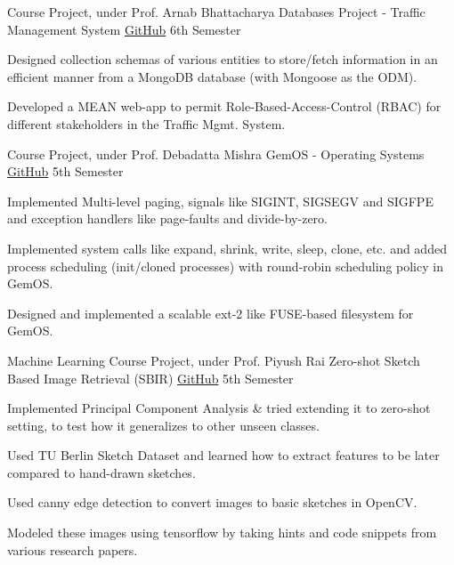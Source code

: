 \begin{cventries}
  \cventry
  {Course Project, under Prof. Arnab Bhattacharya}
  {Databases Project - Traffic Management System}
  {\href{https://github.com/mayanksha/cs315-traffic-mgmt/blob/master/report.pdf}{\faGithubSquare\acvHeaderIconSep GitHub}}
  {6th Semester}
  {
    \begin{cvitems}
    \item Designed collection schemas of various entities to store/fetch information in an efficient manner from a MongoDB database (with Mongoose as the ODM).
    \item Developed a MEAN web-app to permit Role-Based-Access-Control (RBAC) for different stakeholders in the Traffic Mgmt. System.
    \end{cvitems}
  }

  \cventry
  {Course Project, under Prof. Debadatta Mishra}
  {GemOS - Operating Systems}
  {\href{https://github.com/mayanksha/CS330}{\faGithubSquare\acvHeaderIconSep GitHub}}
  {5th Semester}
  {
    \begin{cvitems}
    \item Implemented Multi-level paging, signals like SIGINT, SIGSEGV and SIGFPE and exception handlers like page-faults and divide-by-zero.
    \item Implemented system calls like expand, shrink, write, sleep, clone, etc. and added process scheduling (init/cloned processes) with round-robin scheduling policy in GemOS.
    \item Designed and implemented a scalable ext-2 like FUSE-based filesystem for GemOS.
    \end{cvitems}
  }

  \cventry
  {Machine Learning Course Project, under Prof. Piyush Rai}
  {Zero-shot Sketch Based Image Retrieval (SBIR)}
  {\href{https://github.com/mayanksha/cs771/tree/master/Project}{\faGithubSquare\acvHeaderIconSep GitHub}}
  {5th Semester}
  {
    \begin{cvitems}
	\item Implemented Principal Component Analysis \& tried extending it to zero-shot setting, to test how it generalizes to other unseen classes.
	\item Used TU Berlin Sketch Dataset and learned how to extract features to be later compared to hand-drawn sketches.
	\item Used canny edge detection to convert images to basic sketches in OpenCV.
	\item Modeled these images using tensorflow by taking hints and code snippets from various research papers.
    \end{cvitems}
  }


\end{cventries}
